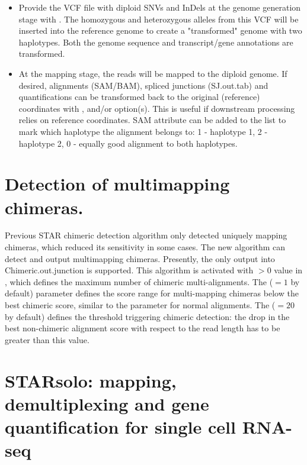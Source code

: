 \documentclass[12pt]{article}
\begin{document}
\begin{itemize}
	\item
	Provide the VCF file with diploid SNVs and InDels at the genome generation stage with      .
	The homozygous and heterozygous alleles from this VCF will be inserted into the reference genome to create a "transformed" genome with two haplotypes.
	Both the genome sequence and transcript/gene annotations are transformed.
	
	\item
	At the mapping stage, the reads will be mapped to the diploid genome.
	If desired, alignments (SAM/BAM), spliced junctions (SJ.out.tab) and quantifications can be transformed back to the original (reference) coordinates with  ,  and/or option(s). This is useful if downstream processing relies on reference coordinates.
	SAM attribute  can be added to the  list to mark which haplotype the alignment belongs to: 1 - haplotype 1, 2 - haplotype 2, 0 - equally good alignment to both haplotypes.
\end{itemize}

\section{Detection of multimapping chimeras.}
Previous STAR chimeric detection algorithm only detected uniquely mapping chimeras, which reduced its sensitivity in some cases.
The new algorithm can detect and output multimapping chimeras. Presently, the only output into Chimeric.out.junction is supported.
This algorithm is activated with $>0$ value in , which defines the maximum number of chimeric multi-alignments.
The  ($=1$ by default) parameter defines the score range for multi-mapping chimeras below the best chimeric score, similar to the  parameter for normal alignments.
The  ($=20$ by default) defines the threshold triggering chimeric detection: the drop in the best non-chimeric alignment score with respect to the read length has to be greater than this value.

\section{STARsolo: mapping, demultiplexing and gene quantification for single cell RNA-seq}
\end{document}
